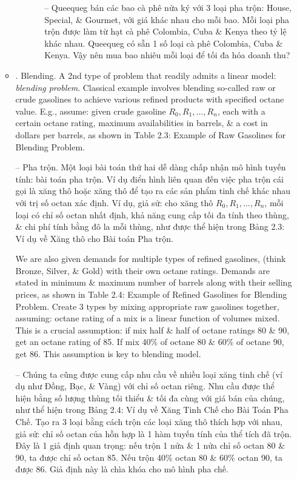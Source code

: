 \documentclass{article}
\begin{document}
\begin{itemize}
\begin{itemize}
\begin{itemize}
\begin{enumerate}
                -- Queequeg bán các bao cà phê nửa ký với 3 loại pha trộn: House, Special, \& Gourmet, với giá khác nhau cho mỗi bao. Mỗi loại pha trộn được làm từ hạt cà phê Colombia, Cuba \& Kenya theo tỷ lệ khác nhau. Queequeg có sẵn 1 số loại cà phê Colombia, Cuba \& Kenya. Vậy nên mua bao nhiêu mỗi loại để tối đa hóa doanh thu?
            \end{enumerate}
        \end{itemize}
        \item {. Blending.} A 2nd type of problem that readily admits a linear model: {\it blending problem}. Classical example involves blending so-called raw or crude gasolines to achieve various refined products with specified octane value. E.g., assume: given crude gasoline $R_0,R_1,\ldots,R_n$, each with a certain octane rating, maximum availabilities in barrels, \& a cost in dollars per barrels, as shown in {\sf Table 2.3: Example of Raw Gasolines for Blending Problem}.

        -- {\sf Pha trộn.} Một loại bài toán thứ hai dễ dàng chấp nhận mô hình tuyến tính: {\sf bài toán pha trộn}. Ví dụ điển hình liên quan đến việc pha trộn cái gọi là xăng thô hoặc xăng thô để tạo ra các sản phẩm tinh chế khác nhau với trị số octan xác định. Ví dụ, giả sử: cho xăng thô $R_0,R_1,\ldots,R_n$, mỗi loại có chỉ số octan nhất định, khả năng cung cấp tối đa tính theo thùng, \& chi phí tính bằng đô la mỗi thùng, như được thể hiện trong {\sf Bảng 2.3: Ví dụ về Xăng thô cho Bài toán Pha trộn}.

        We are also given demands for multiple types of refined gasolines, (think Bronze, Silver, \& Gold) with their own octane ratings. Demands are stated in minimum \& maximum number of barrels along with their selling prices, as shown in {\sf Table 2.4: Example of Refined Gasolines for Blending Problem}. Create 3 types by mixing appropriate raw gasolines together, assuming: octane rating of a mix is a linear function of volumes mixed. This is a crucial assumption: if mix half \& half of octane ratings 80 \& 90, get an octane rating of 85. If mix 40\% of octane 80 \& 60\% of octane 90, get 86. This assumption is key to blending model.

        -- Chúng ta cũng được cung cấp nhu cầu về nhiều loại xăng tinh chế (ví dụ như Đồng, Bạc, \& Vàng) với chỉ số octan riêng. Nhu cầu được thể hiện bằng số lượng thùng tối thiểu \& tối đa cùng với giá bán của chúng, như thể hiện trong {\sf Bảng 2.4: Ví dụ về Xăng Tinh Chế cho Bài Toán Pha Chế}. Tạo ra 3 loại bằng cách trộn các loại xăng thô thích hợp với nhau, giả sử: chỉ số octan của hỗn hợp là 1 hàm tuyến tính của thể tích đã trộn. Đây là 1 giả định quan trọng: nếu trộn 1 nửa \& 1 nửa chỉ số octan 80 \& 90, ta được chỉ số octan 85. Nếu trộn 40\% octan 80 \& 60\% octan 90, ta được 86. Giả định này là chìa khóa cho mô hình pha chế.


\end{itemize}
\end{itemize}
\end{document}
